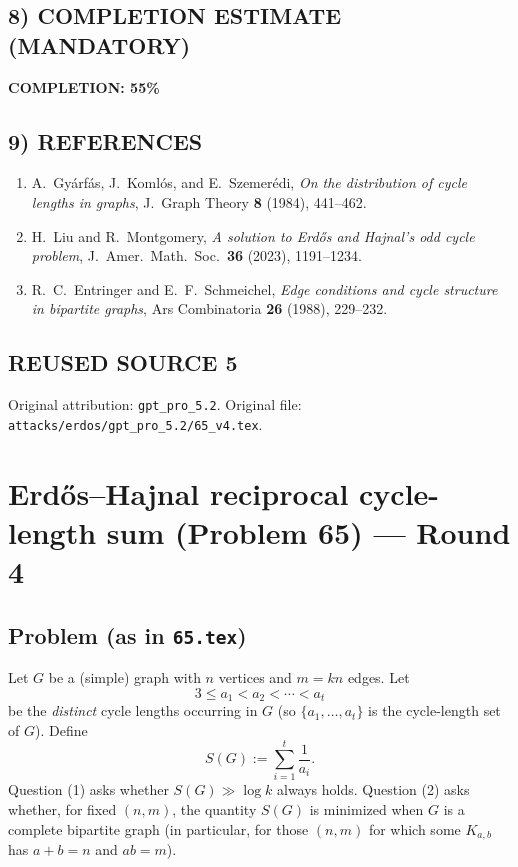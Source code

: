 \subsection{8) COMPLETION ESTIMATE (MANDATORY)}

\textbf{COMPLETION: 55\%}

\subsection{9) REFERENCES}

\begin{enumerate}
\item A.~Gy\'arf\'as, J.~Koml\'os, and E.~Szemer\'edi,
\emph{On the distribution of cycle lengths in graphs},
J.\ Graph Theory \textbf{8} (1984), 441--462.

\item H.~Liu and R.~Montgomery,
\emph{A solution to Erd\H{o}s and Hajnal's odd cycle problem},
J.\ Amer.\ Math.\ Soc.\ \textbf{36} (2023), 1191--1234.

\item R.~C.~Entringer and E.~F.~Schmeichel,
\emph{Edge conditions and cycle structure in bipartite graphs},
Ars Combinatoria \textbf{26} (1988), 229--232.
\end{enumerate}


\subsection*{REUSED SOURCE 5}
Original attribution: \texttt{gpt\_pro\_5.2}.
Original file: \texttt{attacks/erdos/gpt\_pro\_5.2/65\_v4.tex}.

\section{Erd\H{o}s--Hajnal reciprocal cycle-length sum (Problem 65) --- Round 4}

\subsection*{Problem (as in \texttt{65.tex})}
Let $G$ be a (simple) graph with $n$ vertices and $m=kn$ edges. Let
\[
3\le a_1<a_2<\cdots<a_t
\]
be the \emph{distinct} cycle lengths occurring in $G$ (so $\{a_1,\dots,a_t\}$ is the cycle-length set of $G$).
Define
\[
S(G):=\sum_{i=1}^t \frac1{a_i}.
\]
Question (1) asks whether $S(G)\gg \log k$ always holds. Question (2) asks whether, for fixed $(n,m)$, the quantity $S(G)$ is minimized when $G$ is a complete bipartite graph (in particular, for those $(n,m)$ for which some $K_{a,b}$ has $a+b=n$ and $ab=m$).

